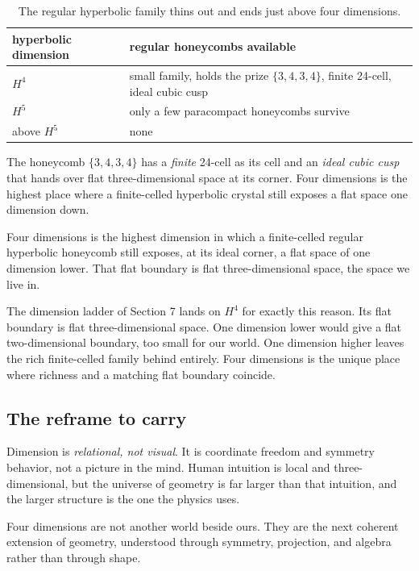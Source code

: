 \begin{table}[ht]
\centering
\begin{tabular}{@{}ll@{}}
\toprule
hyperbolic dimension & regular honeycombs available \\
\midrule
$H^4$ & small family, holds the prize $\{3,4,3,4\}$, finite 24-cell, ideal cubic cusp \\
$H^5$ & only a few paracompact honeycombs survive \\
above $H^5$ & none \\
\bottomrule
\end{tabular}
\caption{The regular hyperbolic family thins out and ends just above four dimensions.}
\label{tab:hyperbolic-thinout}
\end{table}

The honeycomb $\{3,4,3,4\}$ has a \emph{finite} 24-cell as its cell and an \emph{ideal cubic cusp} that hands over flat three-dimensional space at its corner. Four dimensions is the highest place where a finite-celled hyperbolic crystal still exposes a flat space one dimension down.

\begin{result}
Four dimensions is the highest dimension in which a finite-celled regular hyperbolic honeycomb still exposes, at its ideal corner, a flat space of one dimension lower. That flat boundary is flat three-dimensional space, the space we live in.
\end{result}

The dimension ladder of Section 7 lands on $H^4$ for exactly this reason. Its flat boundary is flat three-dimensional space. One dimension lower would give a flat two-dimensional boundary, too small for our world. One dimension higher leaves the rich finite-celled family behind entirely. Four dimensions is the unique place where richness and a matching flat boundary coincide.

\subsection{The reframe to carry}

Dimension is \emph{relational, not visual}. It is coordinate freedom and symmetry behavior, not a picture in the mind. Human intuition is local and three-dimensional, but the universe of geometry is far larger than that intuition, and the larger structure is the one the physics uses.

\begin{principle}
Four dimensions are not another world beside ours. They are the next coherent extension of geometry, understood through symmetry, projection, and algebra rather than through shape.
\end{principle}

